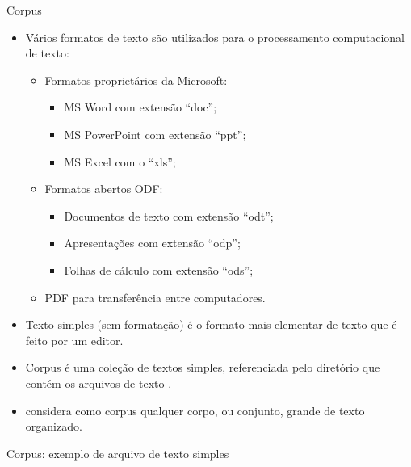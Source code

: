 \documentclass[%
  10pt,%
  aspectratio = 169,%
  compress,%
  t,%
]{beamer}%
\begin{document}
    \begin{frame}{}{Corpus}
        \begin{itemize}
            \item Vários formatos de texto são utilizados para o processamento computacional de texto:
            \begin{itemize}
                \item Formatos proprietários da Microsoft:
                \begin{itemize}    
                    \item MS Word com extensão ``doc'';
                    \item MS PowerPoint com extensão ``ppt'';
                    \item MS Excel com o ``xls'';
                \end{itemize}
                \item Formatos abertos ODF:
                \begin{itemize}    
                    \item Documentos de texto com extensão ``odt'';
                    \item Apresentações com extensão ``odp'';
                    \item Folhas de cálculo com extensão ``ods'';
                \end{itemize}
                \item PDF para transferência entre computadores.
            \end{itemize}
            \item Texto simples (sem formatação) é o formato mais elementar de texto que é feito por um editor.

            \item Corpus é uma coleção de textos simples, referenciada pelo diretório que contém os arquivos de texto \cite[p.~6]{Jo2018TMCIBDC}.

            \item \cite[p.~9]{KwartlerTMPWR2017} considera como corpus qualquer corpo, ou conjunto, grande de texto organizado.
        \end{itemize}
    \end{frame}

    \begin{frame}{}{Corpus: exemplo de arquivo de texto simples}
        
    \end{frame}
\end{document}
